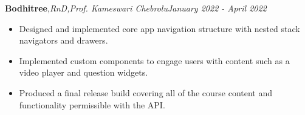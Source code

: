 \textbf{Bodhitree}\sep{\it RnD\sep Prof. Kameswari Chebrolu}\hfill{\sl \small January 2022 - April 2022}\\
\vspace{-5pt}
\begin{itemize}[itemsep = -1.7 mm, leftmargin=*]
\item Designed and implemented core app navigation structure with nested stack navigators and drawers.
\item Implemented custom components to engage users with content such as a video player and question widgets.
\item Produced a final release build covering all of the course content and functionality permissible with the API.
\end{itemize}
